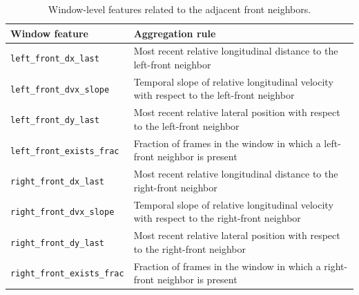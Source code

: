 \begin{table}[H]
    \centering
    \footnotesize
    \caption{Window-level features related to the adjacent front neighbors.}
    \label{tab:appendix_adjacent_front_features}
    \begin{tabularx}{\textwidth}{@{}p{4.2cm}X@{}}
        \toprule
        \textbf{Window feature} & \textbf{Aggregation rule} \\
        \midrule
        \texttt{left\_front\_dx\_last} & Most recent relative longitudinal distance to the left-front neighbor \\
        \texttt{left\_front\_dvx\_slope} & Temporal slope of relative longitudinal velocity with respect to the left-front neighbor \\
        \texttt{left\_front\_dy\_last} & Most recent relative lateral position with respect to the left-front neighbor \\
        \texttt{left\_front\_exists\_frac} & Fraction of frames in the window in which a left-front neighbor is present \\
        \texttt{right\_front\_dx\_last} & Most recent relative longitudinal distance to the right-front neighbor \\
        \texttt{right\_front\_dvx\_slope} & Temporal slope of relative longitudinal velocity with respect to the right-front neighbor \\
        \texttt{right\_front\_dy\_last} & Most recent relative lateral position with respect to the right-front neighbor \\
        \texttt{right\_front\_exists\_frac} & Fraction of frames in the window in which a right-front neighbor is present \\
        \bottomrule
    \end{tabularx}
\end{table}